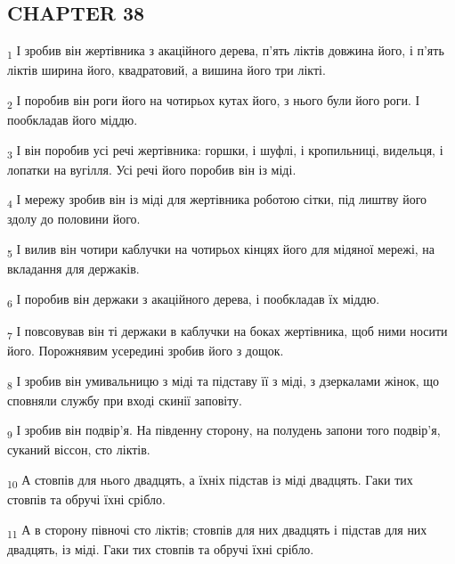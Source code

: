 \subsection{CHAPTER 38}
\begin{tcolorbox}
\textsubscript{1} І зробив він жертівника з акаційного дерева, п'ять ліктів довжина його, і п'ять ліктів ширина його, квадратовий, а вишина його три лікті.
\end{tcolorbox}
\begin{tcolorbox}
\textsubscript{2} І поробив він роги його на чотирьох кутах його, з нього були його роги. І пообкладав його міддю.
\end{tcolorbox}
\begin{tcolorbox}
\textsubscript{3} І він поробив усі речі жертівника: горшки, і шуфлі, і кропильниці, видельця, і лопатки на вугілля. Усі речі його поробив він із міді.
\end{tcolorbox}
\begin{tcolorbox}
\textsubscript{4} І мережу зробив він із міді для жертівника роботою сітки, під лиштву його здолу до половини його.
\end{tcolorbox}
\begin{tcolorbox}
\textsubscript{5} І вилив він чотири каблучки на чотирьох кінцях його для мідяної мережі, на вкладання для держаків.
\end{tcolorbox}
\begin{tcolorbox}
\textsubscript{6} І поробив він держаки з акаційного дерева, і пообкладав їх міддю.
\end{tcolorbox}
\begin{tcolorbox}
\textsubscript{7} І повсовував він ті держаки в каблучки на боках жертівника, щоб ними носити його. Порожнявим усередині зробив його з дощок.
\end{tcolorbox}
\begin{tcolorbox}
\textsubscript{8} І зробив він умивальницю з міді та підставу її з міді, з дзеркалами жінок, що сповняли службу при вході скинії заповіту.
\end{tcolorbox}
\begin{tcolorbox}
\textsubscript{9} І зробив він подвір'я. На південну сторону, на полудень запони того подвір'я, суканий віссон, сто ліктів.
\end{tcolorbox}
\begin{tcolorbox}
\textsubscript{10} А стовпів для нього двадцять, а їхніх підстав із міді двадцять. Гаки тих стовпів та обручі їхні срібло.
\end{tcolorbox}
\begin{tcolorbox}
\textsubscript{11} А в сторону півночі сто ліктів; стовпів для них двадцять і підстав для них двадцять, із міді. Гаки тих стовпів та обручі їхні срібло.
\end{tcolorbox}
